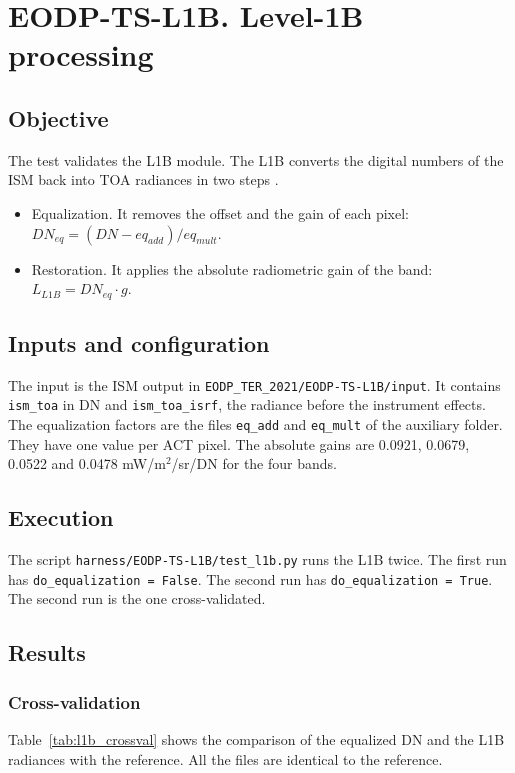 \section{EODP-TS-L1B. Level-1B processing}
\label{sec:l1b}

\subsection{Objective}
The test validates the L1B module.
The L1B converts the digital numbers of the ISM back into TOA radiances in two steps \cite{atbd}.
\begin{itemize}
\item Equalization. It removes the offset and the gain of each pixel: $DN_{eq} = (DN - eq_{add}) / eq_{mult}$.
\item Restoration. It applies the absolute radiometric gain of the band: $L_{L1B} = DN_{eq} \cdot g$.
\end{itemize}

\subsection{Inputs and configuration}
The input is the ISM output in \texttt{EODP\_TER\_2021/EODP-TS-L1B/input}.
It contains \texttt{ism\_toa} in DN and \texttt{ism\_toa\_isrf}, the radiance before the instrument effects.
The equalization factors are the files \texttt{eq\_add} and \texttt{eq\_mult} of the auxiliary folder. They have one value per ACT pixel.
The absolute gains are 0.0921, 0.0679, 0.0522 and 0.0478 mW/m$^2$/sr/DN for the four bands.

\subsection{Execution}
The script \texttt{harness/EODP-TS-L1B/test\_l1b.py} runs the L1B twice.
The first run has \texttt{do\_equalization = False}. The second run has \texttt{do\_equalization = True}. The second run is the one cross-validated.

\subsection{Results}

\subsubsection{Cross-validation}
Table~\ref{tab:l1b_crossval} shows the comparison of the equalized DN and the L1B radiances with the reference.
All the files are identical to the reference.

